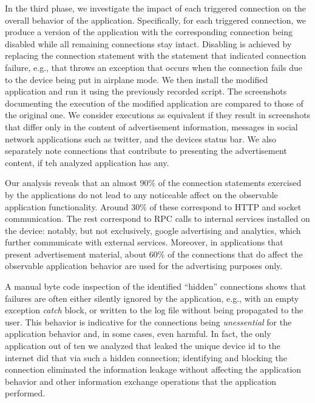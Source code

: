 In the third phase, we investigate the impact of each triggered connection on the overall behavior of the application.
Specifically, for each triggered connection, we produce a version of the application with the corresponding connection being disabled while all remaining connections stay intact. Disabling is achieved by replacing the connection statement with the
statement that indicated connection failure, e.g., that throws an exception that occurs when the connection fails due to the device being put in airplane mode. 
We then install the modified application and run it using the previously recorded script. The screenshots documenting 
the execution of the modified application are compared to those of the original one. We consider executions as equivalent if they result in screenshots that differ only in the content of advertisement information, messages in social network applications such as twitter, and the devices status bar. 
We also separately note connections that contribute to presenting the advertisement content, if teh analyzed application has any. 

Our analysis reveals that an almost 90\% of the connection statements exercised by the applications do not lead to any noticeable affect on the observable application functionality.
Around 30\% of these correspond to HTTP and socket communication. The rest correspond to RPC calls to internal services installed on the device: notably, but not exclusively, google advertising and analytics, which further communicate with external services. 
Moreover, in applications that present advertisement material, about 60\% of the connections that do affect the observable application behavior are used for the advertising purposes only. 

A manual byte code inspection of the identified ``hidden'' connections shows that failures are often either silently ignored by the application, e.g., with an empty exception \emph{catch} block, or written to the log file without being propagated to the user. 
This behavior is indicative for the connections being \emph{unessential} for the application behavior and, in some cases, even harmful. 
%
In fact, the only application out of ten we analyzed that leaked the unique device id to the internet did that via such a hidden connection; 
identifying and blocking the connection eliminated the information leakage without affecting the application behavior and other information exchange 
operations that the application performed. 


